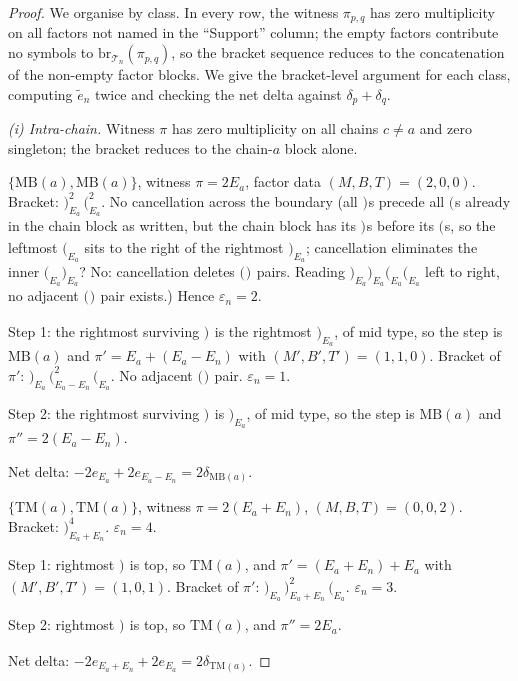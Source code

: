 \documentclass[11pt]{article}
\theoremstyle{definition}
\theoremstyle{remark}
\newcommand{\MB}{\mathrm{MB}}
\newcommand{\TM}{\mathrm{TM}}
\newcommand{\TT}{\mathcal{T}}
\newcommand{\br}{\mathrm{br}}
\newcommand{\labr}[1]{{)}_{#1}}
\newcommand{\labl}[1]{{(}_{#1}}
\begin{document}
\begin{proof}
We organise by class. In every row, the witness $\pi_{p,q}$ has zero multiplicity
on all factors not named in the ``Support'' column; the empty factors contribute
no symbols to $\br_{\TT_n}(\pi_{p,q})$, so the bracket sequence reduces to the
concatenation of the non-empty factor blocks. We give the bracket-level argument
for each class, computing $\tilde e_n$ twice and checking the net delta against
$\delta_p + \delta_q$.

\medskip
\noindent\textit{(i) Intra-chain.} Witness $\pi$ has zero multiplicity on all
chains $c \neq a$ and zero singleton; the bracket reduces to the chain-$a$ block
alone.

\smallskip
\noindent$\{\MB(a), \MB(a)\}$, witness $\pi = 2 E_a$, factor data $(M, B, T) = (2,0,0)$.
Bracket: $\labr{E_a}^{2}\, \labl{E_a}^{2}$. No cancellation across the boundary
(all $\labr{}$s precede all $\labl{}$s already in the chain block as written, but
the chain block has its $\labr{}$s before its $\labl{}$s, so the leftmost $\labl{E_a}$
sits to the right of the rightmost $\labr{E_a}$; cancellation eliminates the
inner $\labl{E_a} \labr{E_a}$? No: cancellation deletes $\labl{}\labr{}$ pairs.
Reading $\labr{E_a}\labr{E_a}\labl{E_a}\labl{E_a}$ left to right, no adjacent
$\labl{}\labr{}$ pair exists.) Hence $\varepsilon_n = 2$.

Step 1: the rightmost surviving $\labr{}$ is the rightmost $\labr{E_a}$, of mid
type, so the step is $\MB(a)$ and $\pi' = E_a + (E_a - E_n)$ with $(M', B', T') =
(1, 1, 0)$. Bracket of $\pi'$: $\labr{E_a}\, \labl{E_a - E_n}^{2}\, \labl{E_a}$.
No adjacent $\labl{}\labr{}$ pair. $\varepsilon_n = 1$.

Step 2: the rightmost surviving $\labr{}$ is $\labr{E_a}$, of mid type, so the
step is $\MB(a)$ and $\pi'' = 2(E_a - E_n)$.

Net delta: $-2 e_{E_a} + 2 e_{E_a - E_n} = 2 \delta_{\MB(a)}$.

\smallskip
\noindent$\{\TM(a), \TM(a)\}$, witness $\pi = 2(E_a + E_n)$, $(M, B, T) = (0,0,2)$.
Bracket: $\labr{E_a + E_n}^{4}$. $\varepsilon_n = 4$.

Step 1: rightmost $\labr{}$ is top, so $\TM(a)$, and
$\pi' = (E_a + E_n) + E_a$ with $(M', B', T') = (1, 0, 1)$. Bracket of $\pi'$:
$\labr{E_a}\, \labr{E_a + E_n}^{2}\, \labl{E_a}$. $\varepsilon_n = 3$.

Step 2: rightmost $\labr{}$ is top, so $\TM(a)$, and $\pi'' = 2 E_a$.

Net delta: $-2 e_{E_a + E_n} + 2 e_{E_a} = 2 \delta_{\TM(a)}$.


\end{proof}
\end{document}
